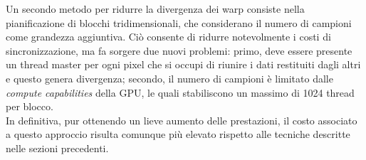 \documentclass[main.tex]{subfiles}
\begin{document}
Un secondo metodo per ridurre la divergenza dei warp consiste nella pianificazione di blocchi tridimensionali, che considerano il numero di campioni come grandezza aggiuntiva. Ciò consente di ridurre notevolmente i costi di sincronizzazione, ma fa sorgere due nuovi problemi: primo, deve essere presente un thread master per ogni pixel che si occupi di riunire i dati restituiti dagli altri e questo genera divergenza; secondo, il numero di campioni è limitato dalle \textit{compute capabilities} della GPU, le quali stabiliscono un massimo di 1024 thread per blocco.\\
In definitiva, pur ottenendo un lieve aumento delle prestazioni, il costo associato a questo approccio risulta comunque più elevato rispetto alle tecniche descritte nelle sezioni precedenti.
\end{document}
